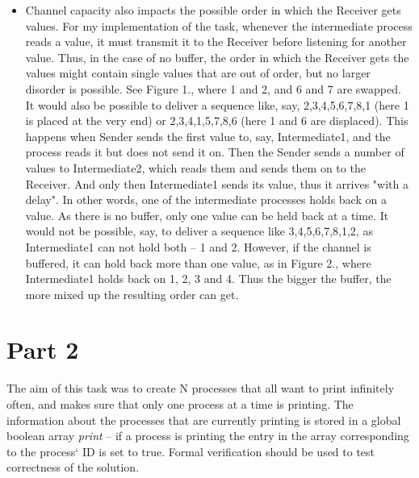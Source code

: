 \documentclass{report}
\newcommand{\tab}{\hspace*{3em}}
\begin{document}
\begin{itemize}
\item Channel capacity also impacts the possible order in which the Receiver gets values. For my implementation of the task, whenever the intermediate process reads a value, it must transmit it to the Receiver before listening for another value. Thus, in the case of no buffer, the order in which the Receiver gets the values might contain single values that are out of order, but no larger disorder is possible. See Figure 1., where 1 and 2, and 6 and 7 are swapped. It would also be possible to deliver a sequence like, say, 2,3,4,5,6,7,8,1 (here 1 is placed at the very end) or 2,3,4,1,5,7,8,6 (here 1 and 6 are displaced). This happens when Sender sends the first value to, say, Intermediate1, and the process reads it but does not send it on. Then the Sender sends a number of values to Intermediate2, which reads them and sends them on to the Receiver. And only then Intermediate1 sends its value, thus it arrives "with a delay". In other words, one of the intermediate processes holds back on a value. As there is no buffer, only one value can be held back at a time. It would not be possible, say, to deliver a sequence like 3,4,5,6,7,8,1,2, as Intermediate1 can not hold both -- 1 and 2. However, if the channel is buffered, it can hold back more than one value, as in Figure 2., where Intermediate1 holds back on 1, 2, 3 and 4. Thus the bigger the buffer, the more mixed up the resulting order can get.

\end{itemize}

\section*{Part 2}
\tab The aim of this task was to create N processes that all want to print infinitely often, and makes sure that only one process at a time is printing. The information about the processes that are currently printing is stored in a global boolean array \textit{print} -- if a process is printing the entry in the array corresponding to the process` ID is set to true. Formal verification should be used to test correctness of the solution.
\end{document}
